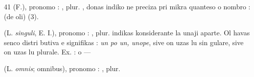 \begin{VUpage}[45]{41}
\VUblancAlinea
{} (F.), pronomo : , plur. , donas indiko\nl
ne preciza pri mikra quanteso o nombro : \nl
{} (de oli) (3).

\VUblancAlinea
{} (L. \textit{singuli}, E. I.), pronomo : , plur. \nl
indikas konsiderante la unaji aparte. Ol havas senco distri\cc
butiva e signifikas : \textit{un po un, unope}, sive on uzas lu sin\cc
gulare, sive on uzas lu plurale. Ex. :  o \nl
{} --- 

\VUblancAlinea
{} (L. \textit{omnis}; omnibus), pronomo : , plur. 
\parplein
\end{VUpage}

